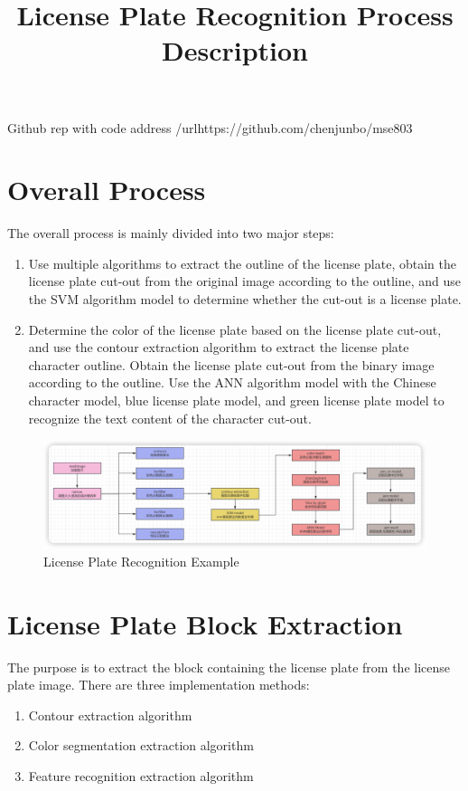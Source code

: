\documentclass{article}
\title{License Plate Recognition Process Description}
\begin{document}
	\maketitle
	Github rep with code address /url{https://github.com/chenjunbo/mse803}
	
	\section{Overall Process}
	The overall process is mainly divided into two major steps:
	\begin{enumerate}
		\item Use multiple algorithms to extract the outline of the license plate, obtain the license plate cut-out from the original image according to the outline, and use the SVM algorithm model to determine whether the cut-out is a license plate.
		\item Determine the color of the license plate based on the license plate cut-out, and use the contour extraction algorithm to extract the license plate character outline. Obtain the license plate cut-out from the binary image according to the outline. Use the ANN algorithm model with the Chinese character model, blue license plate model, and green license plate model to recognize the text content of the character cut-out.
	\end{enumerate}
	
	\begin{figure}[H]
		\centering
		\includegraphics[width=\linewidth]{mdpic/image-20240925000409837.png}
		\caption{License Plate Recognition Example}
	\end{figure}
	
	\section{License Plate Block Extraction}
	The purpose is to extract the block containing the license plate from the license plate image. There are three implementation methods:
	\begin{enumerate}
		\item Contour extraction algorithm
		\item Color segmentation extraction algorithm
		\item Feature recognition extraction algorithm
	\end{enumerate}
	
\end{document}
